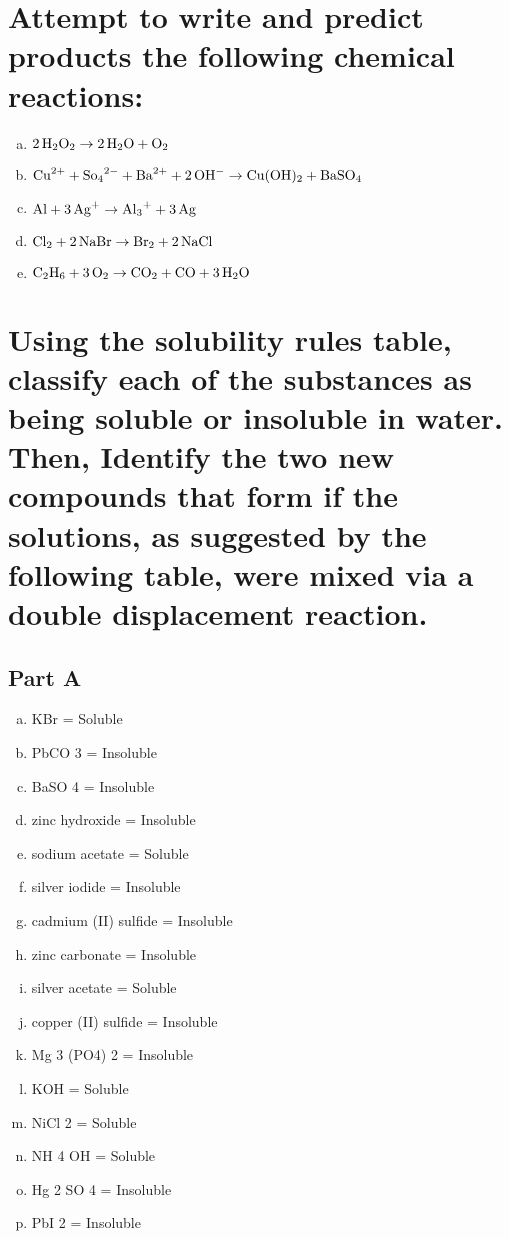 \documentclass{scrartcl}
\begin{document}
\section{Attempt to write and predict products the following chemical reactions:}
\label{sec:orga3b071d}
\begin{enumerate}[a.]
\item \(\ce{2H2O2}\rightarrow\ce{2H2O + O2}\)
\item \(\ce{Cu^{2+} + So4^{2-} + Ba^{2+} + 2OH-}\rightarrow\ce{Cu(OH)2 + BaSO4}\)
\item \(\ce{Al + 3Ag+}\rightarrow\ce{Al3+ + 3Ag}\)
\item \(\ce{Cl2 + 2NaBr}\rightarrow\ce{Br2 + 2NaCl}\)
\item \(\ce{C2H6 + 3O2}\rightarrow\ce{CO2 + CO + 3H2O}\)
\end{enumerate}

\section{Using the solubility rules table, classify each of the substances as being soluble or insoluble in water. Then, Identify the two new compounds that form if the solutions, as suggested by the following table, were mixed via a double displacement reaction.}
\label{sec:org26f65dd}
\subsection{Part A}
\label{sec:org61f65b5}
\begin{enumerate}[a.]
\item KBr = Soluble
\item PbCO 3 = Insoluble
\item BaSO 4 = Insoluble
\item zinc hydroxide = Insoluble
\item sodium acetate = Soluble
\item silver iodide = Insoluble
\item cadmium (II) sulfide = Insoluble
\item zinc carbonate = Insoluble
\item silver acetate = Soluble
\item copper (II) sulfide = Insoluble
\item Mg 3 (PO4) 2 = Insoluble
\item KOH = Soluble
\item NiCl 2 = Soluble
\item NH 4 OH = Soluble
\item Hg 2 SO 4 = Insoluble
\item PbI 2 = Insoluble
\end{enumerate}
\end{document}
